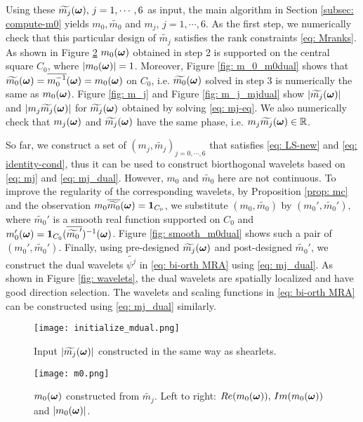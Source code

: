 Using these $\widetilde{m_{j}}(\boldsymbol{\omega}),\,j = 1,\cdots,6$ as input, the main algorithm in Section \ref{subsec: compute-m0} yields $m_0,\widetilde{m_0}$ and $m_j, \, j = 1,\cdots, 6$. As the first step, we numerically check that this particular design of $\widetilde{m_j}$ satisfies the rank constraints \eqref{eq: Mranks}. As shown in Figure \ref{fig: m_0} $m_0(\boldsymbol{\omega})$ obtained in step 2 is supported on the central square $C_0$, where $|m_0(\boldsymbol{\omega})| = 1$. Moreover, Figure \ref{fig: m_0_m0dual} shows that $\widetilde{m_{0}}(\boldsymbol{\omega}) = \overline{m_0^{-1}}(\boldsymbol{\omega}) = m_0(\boldsymbol{\omega})$ on $C_0$, i.e. $\widetilde{m_{0}}(\boldsymbol{\omega})$ solved in step 3 is numerically the same as $m_0(\boldsymbol{\omega})$.
Figure \ref{fig: m_j} and Figure \ref{fig: m_j_mjdual} show $|\widetilde{m_{j}}(\boldsymbol{\omega})|$ and $|m_j\widetilde{m_{j}}(\boldsymbol{\omega})|$ for $\widetilde{m_{j}}(\boldsymbol{\omega})$ obtained by solving \eqref{eq: mj-eq}. We also numerically check that $m_j(\boldsymbol{\omega})$ and $\widetilde{m_{j}}(\boldsymbol{\omega})$ have the same phase, i.e. $m_j\widetilde{m_{j}}(\boldsymbol{\omega})\in \mathbb{R}$.

So far, we construct a set of $(m_j,\widetilde{m_j})_{j = 0,\cdots,6}$ that satisfies \eqref{eq: LS-new} and \eqref{eq: identity-cond}, thus it can be used to construct biorthogonal wavelets based on \eqref{eq: mj} and \eqref{eq: mj_dual}. However, $m_0$ and $\widetilde{m_0}$ here are not continuous. To improve the regularity of the corresponding wavelets, by Proposition \ref{prop: mc} and the observation $m_0\overline{\widetilde{m_{0}}}(\boldsymbol{\omega}) = \boldsymbol{1}_{C_0}$, we substitute $(m_0,\widetilde{m_0})$ by $(m_0', \widetilde{m_0}')$, where $\widetilde{m_0}'$ is a smooth real function supported on $C_0$ and $m_0'(\boldsymbol{\omega}) = \boldsymbol{1}_{C_0}(\overline{\widetilde{m_0}'})^{-1}(\boldsymbol{\omega})$. Figure \ref{fig: smooth_m0dual} shows such a pair of $(m_0',\widetilde{m_0}')$. Finally, using pre-designed $\widetilde{m_{j}}(\boldsymbol{\omega})$ and post-designed $\widetilde{m_0}'$, we construct the dual wavelets  $\widetilde{\psi^j}$ in \eqref{eq: bi-orth MRA} using \eqref{eq: mj_dual}. As shown in Figure \ref{fig: wavelets}, the dual wavelets are spatially localized and have good direction selection. The wavelets and scaling functions in \eqref{eq: bi-orth MRA} can be constructed using \eqref{eq: mj_dual} similarly.

\begin{figure}
\centering
\texttt{[image: initialize\_mdual.png]}
\caption{ Input $|\widetilde{m_{j}}(\boldsymbol{\omega})|$ constructed in the same way as shearlets.}
\label{fig: mjdual}
\end{figure}

\begin{figure}
\centering
\texttt{[image: m0.png]}
\caption{ $m_0(\boldsymbol{\omega})$ constructed from $\widetilde{m_j}$. Left to right: $Re(m_0(\boldsymbol{\omega})),\, Im(m_0(\boldsymbol{\omega}))$ and $|m_0(\boldsymbol{\omega})|$.}
\label{fig: m_0}
\end{figure}

